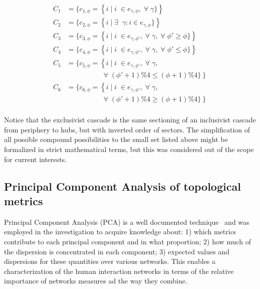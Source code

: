 \documentclass[%
	aip,
	jmp,%
	amsmath,amssymb,
	reprint,%
]{revtex4-1}
\begin{document}
\begin{equation}
	\begin{split}
		C_1&=\{c_{1,\phi}=\left\{i\mid i\;\in e_{\gamma,\phi}, \;\forall\; \gamma\}\right\} \\
		C_2&=\{c_{2,\phi}=\left\{i\mid \exists \;\;\gamma: i \in e_{\gamma,\phi}\}\right\} \\
		C_3&=\{c_{3,\phi}=\left\{i\mid i\;\in e_{\gamma,\phi'}, \;\forall\; \gamma,\;\forall\;\phi'\geq \phi\}\right\} \\
		C_4&=\{c_{4,\phi}=\left\{i\mid i\;\in e_{\gamma,\phi'}, \;\forall\; \gamma,\;\forall\;\phi'\leq \phi\}\right\} \\
		C_5&=\{c_{5,\phi}=\left\{i\mid i\;\in e_{\gamma,\phi'}, \;\forall\; \gamma,\right.\\
																																	&\;\;\;\;\;\;\;\;\;\;\;\;\;\;\;\;\;\; \left.\;\forall\;(\phi'+1)\%4\leq (\phi+1)\%4\}\right\} \\
		C_6&=\{c_{6,\phi}=\left\{i\mid i\;\in e_{\gamma,\phi'}, \;\forall\; \gamma,\right.\\
																																	&\;\;\;\;\;\;\;\;\;\;\;\;\;\;\;\;\;\; \left.\;\forall\;(\phi'+1)\%4\geq (\phi+1)\%4\}\right\} \\
	\end{split}
\end{equation}

Notice that the exclusivist cascade is the same sectioning of an inclusivist cascade from periphery to hubs, but with inverted order of sectors. 
The simplification of all possible compound possibilities to the small set listed above might be formalized in strict mathematical terms, but this was considered out of the scope for current interests.




\subsection{Principal Component Analysis of topological metrics}\label{sec:pca}
Principal Component Analysis (PCA) is a well documented technique~\cite{pca}
and was employed in the investigation to acquire knowledge about:
1) which metrics contribute to each principal component and in what proportion;
2) how much of the dispersion is concentrated in each component;
3) expected values and dispersions for these quantities over various networks.
This enables a characterization of the human interaction networks
in terms of the relative importance of networks measures ad the way they combine.
\end{document}
